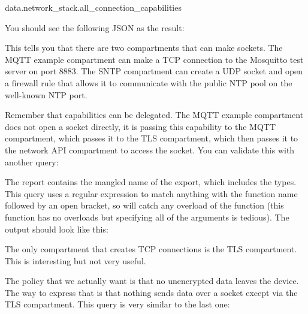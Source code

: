 \begin{regosnippet}
data.network_stack.all_connection_capabilities
\end{regosnippet}

You should see the following JSON as the result:

\begin{jsonsnippet}
[
  {
    "capability": {
      "connection_type": "UDP",
      "host": "pool.ntp.org",
      "port": 123
    \},
    "owner": "SNTP"
  \},
  {
    "capability": {
      "connection_type": "TCP",
      "host": "test.mosquitto.org",
      "port": 8883
    \},
    "owner": "mqtt_example"
  \}
]
\end{jsonsnippet}

This tells you that there are two compartments that can make sockets.
The MQTT example compartment can make a TCP connection to the Mosquitto test server on port 8883.
The SNTP compartment can create a UDP socket and open a firewall rule that allows it to communicate with the public NTP pool on the well-known NTP port.

Remember that capabilities can be delegated.
The MQTT example compartment does not open a socket directly, it is passing this capability to the MQTT compartment, which passes it to the TLS compartment, which then passes it to the network API compartment to access the socket.
You can validate this with another query:


The report contains the mangled name of the export, which includes the types.
This query uses a regular expression to match anything with the function name followed by an open bracket, so will catch any overload of the function (this function has no overloads but specifying all of the arguments is tedious).
The output should look like this:

\begin{jsonsnippet}
[
  "TLS"
]
\end{jsonsnippet}

The only compartment that creates TCP connections is the TLS compartment.
This is interesting but not very useful.

The policy that we actually want is that no unencrypted data leaves the device.
The way to express that is that nothing sends data over a socket except via the TLS compartment.
This query is very similar to the last one:

